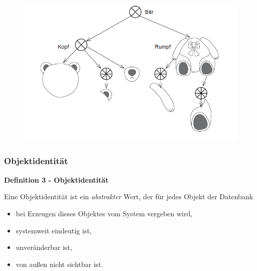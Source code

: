 \begin{figure}[!h]
	\centering
	\includegraphics[scale=0.5]{img/struc_1.png}
\end{figure}

\subsubsection{Objektidentität}
\begin{framed}
	\textbf{Definition 3 - Objektidentität}
	\begin{description}
		\item Eine Objektidentität ist ein \textit{abstrakter} Wert, der für jedes Objekt der Datenbank
		\begin{itemize}
			\item bei Erzeugen dieses Objektes vom System vergeben wird,
			\item systemweit eindeutig ist,
			\item unveränderbar ist,
			\item von außen nicht sichtbar ist.
		\end{itemize}
	\end{description}
\end{framed}

